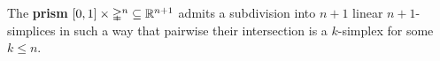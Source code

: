 	\begin{lemma}
		The \textbf{prism} $[0,1] \times \mathbb{\Delta}^n \subseteq \mathbb{R}^{n+1}$ admits a subdivision into $n+1$ linear $n+1$-simplices in such a way that pairwise their intersection is a $k$-simplex for some $k \leq n$.
	\end{lemma}
